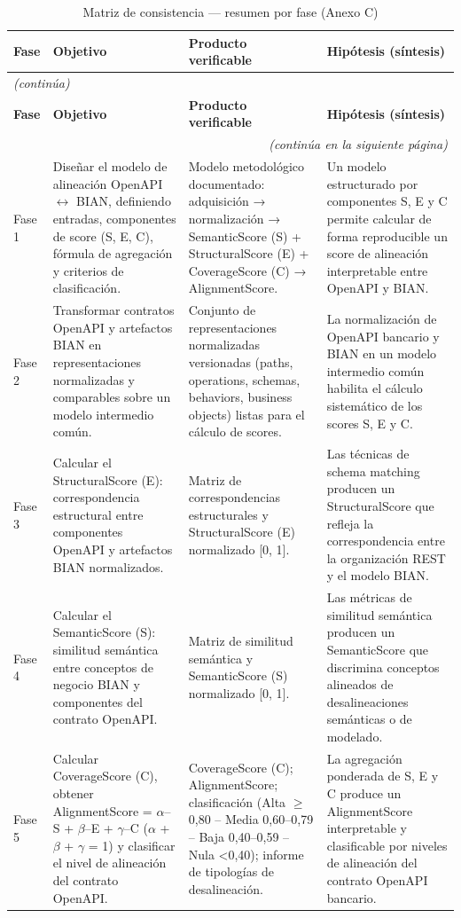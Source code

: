 \begin{longtable}{@{}p{}p{}p{}p{}@{}}
\caption{Matriz de consistencia — resumen por fase (Anexo C)} \label{tab:anexo-c} \\
\toprule
\textbf{Fase} & \textbf{Objetivo} & \textbf{Producto verificable} & \textbf{Hipótesis (síntesis)} \\
\midrule
\endfirsthead
\multicolumn{4}{l}{\textit{(continúa)}} \\
\midrule
\textbf{Fase} & \textbf{Objetivo} & \textbf{Producto verificable} & \textbf{Hipótesis (síntesis)} \\
\midrule
\endhead
\midrule
\multicolumn{4}{r}{\textit{(continúa en la siguiente página)}} \\
\endfoot
\bottomrule
\endlastfoot
Fase 1 & Diseñar el modelo de alineación OpenAPI $\leftrightarrow$ BIAN, definiendo entradas, componentes de score (S, E, C), fórmula de agregación y criterios de clasificación. & Modelo metodológico documentado: adquisición → normalización → SemanticScore (S) + StructuralScore (E) + CoverageScore (C) → AlignmentScore. & Un modelo estructurado por componentes S, E y C permite calcular de forma reproducible un score de alineación interpretable entre OpenAPI y BIAN. \\
Fase 2 & Transformar contratos OpenAPI y artefactos BIAN en representaciones normalizadas y comparables sobre un modelo intermedio común. & Conjunto de representaciones normalizadas versionadas (paths, operations, schemas, behaviors, business objects) listas para el cálculo de scores. & La normalización de OpenAPI bancario y BIAN en un modelo intermedio común habilita el cálculo sistemático de los scores S, E y C. \\
Fase 3 & Calcular el StructuralScore (E): correspondencia estructural entre componentes OpenAPI y artefactos BIAN normalizados. & Matriz de correspondencias estructurales y StructuralScore (E) normalizado [0, 1]. & Las técnicas de schema matching producen un StructuralScore que refleja la correspondencia entre la organización REST y el modelo BIAN. \\
Fase 4 & Calcular el SemanticScore (S): similitud semántica entre conceptos de negocio BIAN y componentes del contrato OpenAPI. & Matriz de similitud semántica y SemanticScore (S) normalizado [0, 1]. & Las métricas de similitud semántica producen un SemanticScore que discrimina conceptos alineados de desalineaciones semánticas o de modelado. \\
Fase 5 & Calcular CoverageScore (C), obtener AlignmentScore = $\alpha$--S + $\beta$--E + $\gamma$--C ($\alpha$ + $\beta$ + $\gamma$ = 1) y clasificar el nivel de alineación del contrato OpenAPI. & CoverageScore (C); AlignmentScore; clasificación (Alta $\geq$0,80 -- Media 0,60–0,79 -- Baja 0,40–0,59 -- Nula <0,40); informe de tipologías de desalineación. & La agregación ponderada de S, E y C produce un AlignmentScore interpretable y clasificable por niveles de alineación del contrato OpenAPI bancario. \\
\end{longtable}
